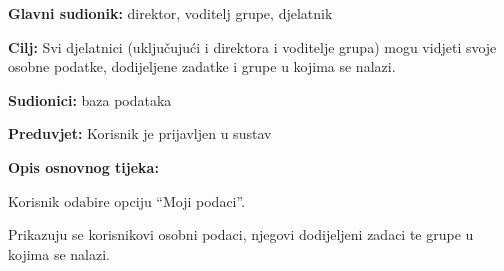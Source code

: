 			\noindent {}
			\begin{packed_item}
				\item \textbf{Glavni sudionik: } direktor, voditelj grupe, djelatnik
				\item  \textbf{Cilj:} Svi djelatnici (uključujući i direktora i voditelje grupa) mogu vidjeti svoje osobne podatke, dodijeljene zadatke i grupe u kojima se nalazi. 
				\item  \textbf{Sudionici:} baza podataka
				\item  \textbf{Preduvjet:} Korisnik je prijavljen u sustav
				\item  \textbf{Opis osnovnog tijeka:}
				\item[] \begin{packed_enum}
					\item Korisnik odabire opciju “Moji podaci”. 
					\item Prikazuju se korisnikovi osobni podaci, njegovi dodijeljeni zadaci te grupe u kojima se nalazi.
				\end{packed_enum}
			\end{packed_item}
			

